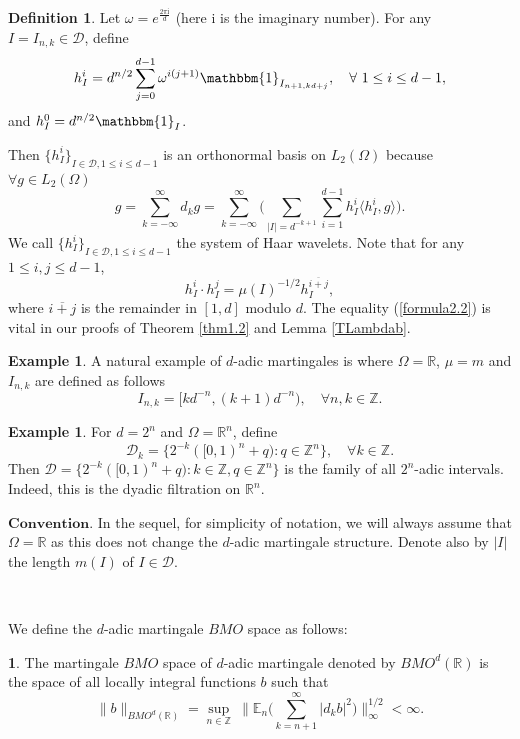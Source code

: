 \documentclass[oneside,english,a4wide]{amsart}
\numberwithin{equation}{section}
\numberwithin{figure}{section}
\theoremstyle{plain}
\theoremstyle{plain}
\theoremstyle{definition}
\newtheorem{defn}[thm]{\protect\definitionname}
\theoremstyle{plain}
\theoremstyle{remark}
\newtheorem{rem}[thm]{\protect\remarkname}
\theoremstyle{definition}
\newtheorem{definition}[thm]{Definition}
\newtheorem{example}[thm]{Example}
\theoremstyle{remark}
\theoremstyle{definition}
\providecommand{\definitionname}{Definition}
\providecommand{\remarkname}{Remark}
\newcommand{\8}{\infty}
\begin{document}
\begin{definition}\label{haar}
	Let $\omega=e^{\frac{2\pi \mathrm{i}}{d}}$ (here $\mathrm{i} $ is the imaginary number). For any $I=I_{n,k}\in \mathcal{D}$, define
	\[h_I^i=d^{n/2}\sum_{j=0}^{d-1}  \omega^{i{(j+1)}}\mathbbm{1}_{I_{n+1,kd+j}}, \quad \forall \ 1\leq i\leq d-1,\]
	and $h_I^0=d^{n/2}\mathbbm{1}_I$.
\end{definition}
Then $\{h_I^i\}_{I\in\mathcal{D},1\leq i\leq d-1}$ is an orthonormal basis on $L_2(\Omega)$ because $\forall g\in L_2(\Omega)$
\begin{equation}
	g=\sum_{k=-\8}^{\8} d_kg=\sum_{k=-\8}^{\8} \biggl(\sum_{|I|=d^{-k+1}}\sum_{i=1}^{d-1}h_I^i\langle h_I^i,g\rangle\biggr).
\end{equation}   
We call $\{h_I^i\}_{I\in\mathcal{D},1\leq i\leq d-1}$  the system of Haar wavelets. Note that for any $1\leq i, j\leq d-1$,
\begin{equation}\label{formula2.2}
	h_I^i\cdot h_I^j=\mu(I)^{-1/2} h_I^{\overline{i+j}},
\end{equation}
where $\overline{i+j}$ is the remainder in $[1, d]$ modulo $d$. The equality (\ref{formula2.2}) is vital in our proofs of Theorem \ref{thm1.2} and Lemma \ref{TLambdab}.

\begin{example}\label{example1.4.3}
	A natural example of $d$-adic martingales is where $\Omega=\mathbb{R}$, $\mu=m$ and $I_{n,k}$ are defined as follows
	\[ I_{n,k}=[kd^{-n},(k+1)d^{-n}), \quad \forall n,k\in\mathbb{Z}.\]
\end{example}
\begin{example}	
	For $d=2^n$ and $\Omega=\mathbb{R}^n$, define
	\[ \mathcal{ D}_k=\{2^{-k}([0,1)^n+q):q\in\mathbb{Z}^n\}, \quad \forall k\in \mathbb{Z}.\]
	Then $\mathcal{D}=\{2^{-k}([0,1)^n+q):k\in\mathbb{Z},q\in\mathbb{Z}^n\} $ is the family of all $2^n$-adic intervals. Indeed, this is the dyadic filtration on $\mathbb{R}^n$.
\end{example}
\noindent$\mathit{\textbf{Convention}}$. In the sequel, for simplicity of notation, we will always assume that $\Omega=\mathbb{R}$ as this does not change the $d$-adic martingale structure. Denote also by $|I|$ the length $m(I)$ of $I\in\mathcal{ D}$. 

\

We define the $d$-adic martingale $BMO$ space as follows:
\begin{defn}
	The martingale $BMO$ space of $d$-adic martingale denoted by $BMO^d(\mathbb{R})$ is the space of all locally integral functions $b$ such that
	\begin{equation}\label{BMOd}
		\|b\|_{BMO^d(\mathbb{R})}= \sup _{n\in\mathbb{Z}}\ \bigg\|\mathbb{E}_n\bigg(\sum_{k=n+1}^{\8}|d_k b|^2\bigg)\bigg\|_\8^{1/2} <\infty. 
	\end{equation} 
\end{defn}
\end{document}
